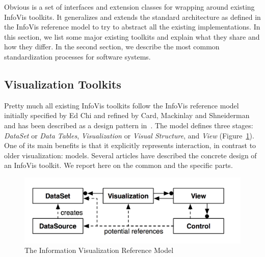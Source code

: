 Obvious is a set of interfaces and extension classes for wrapping
around existing InfoVis toolkits.  It generalizes and extends the
standard architecture as defined in the InfoVis reference model to try
to abstract all the existing implementations.  In this section, we
list some major existing toolkits and explain what they share and how
they differ.  In the second section, we describe the most common
standardization processes for software systems.

\subsection{Visualization Toolkits}

Pretty much all existing InfoVis toolkits follow the
InfoVis reference model initially specified by Ed Chi and refined by
Card, Mackinlay and Shneiderman~\cite{ReadingsIV,ChiRefModel} and has
been described as a design pattern in~\cite{DesignPatternsIV}.  The
model defines three stages: \emph{DataSet} or \emph{Data Tables},
\emph{Visualization} or \emph{Visual Structure}, and \emph{View}
(Figure~\ref{fig:refmodel}).  One of its main benefits is that it
explicitly represents interaction, in contrast to older visualization:
models.  Several articles have described the concrete design of an
InfoVis toolkit.  We report here on the common and
the specific parts.

\begin{figure}
\includegraphics[width=\columnwidth]{figures/refmodpat}
\caption{The Information Visualization Reference Model~\cite{DesignPatternsIV}}
\label{fig:refmodel}
\end{figure}


